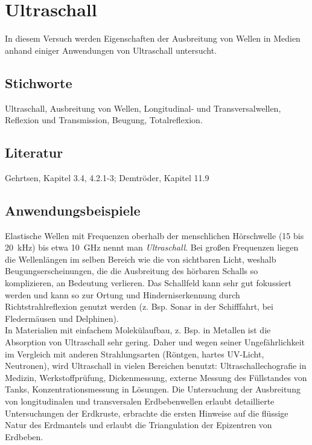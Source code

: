 \chapter{Ultraschall}
\label{vn:2}


In diesem Versuch werden Eigenschaften der Ausbreitung von Wellen in Medien anhand einiger Anwendungen von Ultraschall untersucht.
%
\section{Stichworte}
Ultraschall, Ausbreitung von Wellen, Longitudinal- und Transversalwellen, Reflexion und Transmission, Beugung, Totalreflexion.
%
\section{Literatur}
Gehrtsen, Kapitel 3.4, 4.2.1-3; Demtröder, Kapitel 11.9
%
\section{Anwendungsbeispiele}
%
Elastische Wellen mit Frequenzen oberhalb der menschlichen Hörschwelle (15 bis 20~kHz) bis etwa 10~GHz nennt man \textit{Ultraschall}. Bei großen Frequenzen liegen die Wellenlängen im selben Bereich wie die von sichtbaren Licht, weshalb Beugungserscheinungen, die die Ausbreitung des hörbaren Schalls so komplizieren, an Bedeutung verlieren. Das Schallfeld kann sehr gut fokussiert werden und kann so zur Ortung und Hinderniserkennung durch Richtstrahlreflexion genutzt werden (z. Bsp. Sonar in der Schifffahrt, bei Fledermäusen und Delphinen). \\
In Materialien mit einfachem Molekülaufbau, z. Bsp. in Metallen ist die Absorption von Ultraschall sehr gering. Daher und wegen seiner Ungefährlichkeit im Vergleich mit anderen Strahlungsarten (Röntgen, hartes UV-Licht, Neutronen), wird Ultraschall in vielen Bereichen benutzt: Ultraschallechografie in Medizin, Werkstoffprüfung, Dickenmessung, externe Messung des Füllstandes von Tanks, Konzentrationsmessung in Lösungen. Die Untersuchung der Ausbreitung von longitudinalen und transversalen Erdbebenwellen erlaubt detaillierte Untersuchungen der Erdkruste, erbrachte die ersten Hinweise auf die flüssige Natur des Erdmantels und erlaubt die Triangulation der Epizentren von Erdbeben.
%
